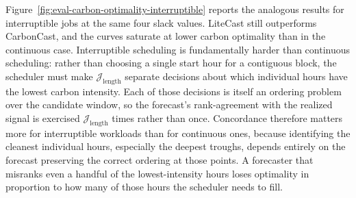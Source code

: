 Figure~\ref{fig:eval-carbon-optimality-interruptible} reports the analogous results for interruptible jobs at the same four slack values.
LiteCast still outperforms CarbonCast, and the curves saturate at lower carbon optimality than in the continuous case.
Interruptible scheduling is fundamentally harder than continuous scheduling: rather than choosing a single start hour for a contiguous block, the scheduler must make $\mathcal{J}_{\text{length}}$ separate decisions about which individual hours have the lowest carbon intensity.
Each of those decisions is itself an ordering problem over the candidate window, so the forecast's rank-agreement with the realized signal is exercised $\mathcal{J}_{\text{length}}$ times rather than once.
Concordance therefore matters more for interruptible workloads than for continuous ones, because identifying the cleanest individual hours, especially the deepest troughs, depends entirely on the forecast preserving the correct ordering at those points.
A forecaster that misranks even a handful of the lowest-intensity hours loses optimality in proportion to how many of those hours the scheduler needs to fill.




